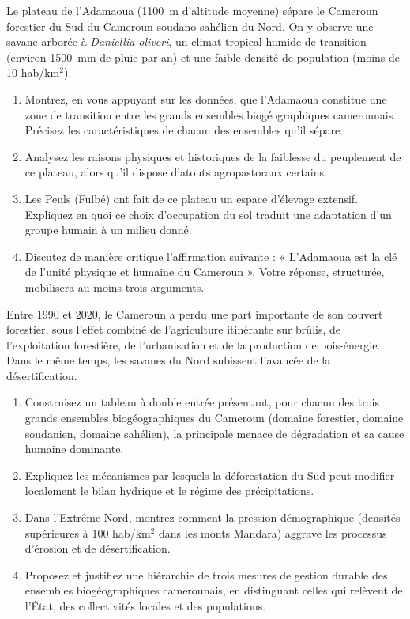 \documentclass[11pt]{article}
\begin{document}
\begin{exercice}
Le plateau de l'Adamaoua (\SI{1100}{m} d'altitude moyenne) sépare le Cameroun forestier du Sud du Cameroun soudano-sahélien du Nord. On y observe une savane arborée à \textit{Daniellia oliveri}, un climat tropical humide de transition (environ \SI{1500}{mm} de pluie par an) et une faible densité de population (moins de 10 hab/km$^2$).

\begin{enumerate}
\item Montrez, en vous appuyant sur les données, que l'Adamaoua constitue une zone de transition entre les grands ensembles biogéographiques camerounais. Précisez les caractéristiques de chacun des ensembles qu'il sépare.
\item Analysez les raisons physiques et historiques de la faiblesse du peuplement de ce plateau, alors qu'il dispose d'atouts agropastoraux certains.
\item Les Peuls (Fulbé) ont fait de ce plateau un espace d'élevage extensif. Expliquez en quoi ce choix d'occupation du sol traduit une adaptation d'un groupe humain à un milieu donné.
\item Discutez de manière critique l'affirmation suivante : « L'Adamaoua est la clé de l'unité physique et humaine du Cameroun ». Votre réponse, structurée, mobilisera au moins trois arguments.
\end{enumerate}
\end{exercice}

\begin{exercice}
Entre 1990 et 2020, le Cameroun a perdu une part importante de son couvert forestier, sous l'effet combiné de l'agriculture itinérante sur brûlis, de l'exploitation forestière, de l'urbanisation et de la production de bois-énergie. Dans le même temps, les savanes du Nord subissent l'avancée de la désertification.

\begin{enumerate}
\item Construisez un tableau à double entrée présentant, pour chacun des trois grands ensembles biogéographiques du Cameroun (domaine forestier, domaine soudanien, domaine sahélien), la principale menace de dégradation et sa cause humaine dominante.
\item Expliquez les mécanismes par lesquels la déforestation du Sud peut modifier localement le bilan hydrique et le régime des précipitations.
\item Dans l'Extrême-Nord, montrez comment la pression démographique (densités supérieures à 100 hab/km$^2$ dans les monts Mandara) aggrave les processus d'érosion et de désertification.
\item Proposez et justifiez une hiérarchie de trois mesures de gestion durable des ensembles biogéographiques camerounais, en distinguant celles qui relèvent de l'État, des collectivités locales et des populations.
\end{enumerate}
\end{exercice}
\end{document}
